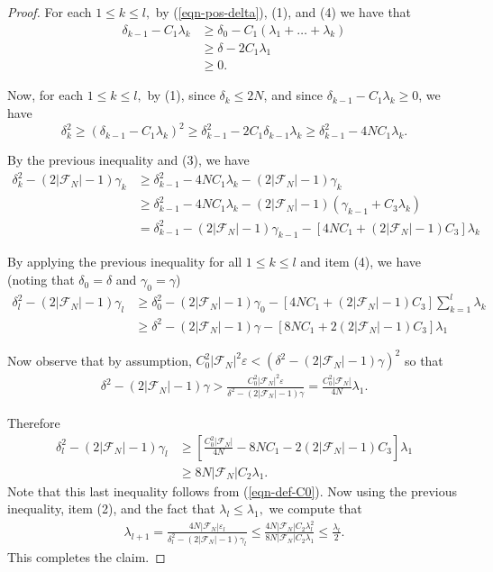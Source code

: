 \documentclass[10pt,a4paper]{amsart}
\newcommand{\cF}{\mathcal{F}}
\newcommand{\ee}{\varepsilon}
\begin{document}
\begin{proof}
    For each $1\le k \le l,$ by (\ref{eqn-pos-delta}), (1), and (4) we have that 
    \begin{align*}
        \delta_{k-1} - C_1\lambda_k &\ge \delta_0 - C_1(\lambda_1 + \ldots + \lambda_k)\\
        &\ge \delta - 2C_1\lambda_1\\
        &\ge 0.
    \end{align*}

    Now, for each $1\le k\le l,$ by (1), since $\delta_k \le 2N$, and since $\delta_{k-1}-C_1\lambda_k\ge 0$, we have
    \begin{equation*}
        \delta_k^2 \ge (\delta_{k-1}- C_1\lambda_k)^2 \ge \delta_{k-1}^2 - 2C_1\delta_{k-1}\lambda_k \ge \delta^2_{k-1} - 4NC_1\lambda_k.
    \end{equation*}

    By the previous inequality and (3), we have
    \begin{align*}
        \delta_k^2 - (2|\cF_N|-1)\gamma_k &\ge \delta^2_{k-1} - 4NC_1\lambda_k - (2|\cF_N|-1)\gamma_k \\
        &\ge \delta^2_{k-1} - 4NC_1\lambda_k - (2|\cF_N|-1)(\gamma_{k-1} + C_3\lambda_k) \\
        &= \delta^2_{k-1}  - (2|\cF_N|-1)\gamma_{k-1} - [4NC_1 + (2|\cF_N|-1)C_3]\lambda_k
    \end{align*}

    By applying the previous inequality for all $1\le k\le l$ and item (4), we have (noting that $\delta_0=\delta$ and $\gamma_0=\gamma$)
    \begin{align*}
         \delta_l^2 - (2|\cF_N|-1)\gamma_l &\ge \delta_0^2 - (2|\cF_N|-1)\gamma_0 - [4NC_1 + (2|\cF_N|-1)C_3]\sum_{k=1}^l\lambda_k\\
         &\ge \delta^2 - (2|\cF_N|-1)\gamma - [8NC_1 + 2(2|\cF_N|-1)C_3]\lambda_1 
    \end{align*}

    Now observe that by assumption, $C_0^2|\cF_N|^2\ee < (\delta^2 - (2|\cF_N|-1)\gamma)^2$ so that 
    \begin{align*}
        \delta^2 - (2|\cF_N|-1)\gamma > \frac{C_0^2|\cF_N|^2\ee}{\delta^2 - (2|\cF_N|-1)\gamma} = \frac{C_0^2|\cF_N|}{4N}\lambda_1.
    \end{align*}

    Therefore 
    \begin{align*}
        \delta_l^2 - (2|\cF_N|-1)\gamma_l &\ge \left[\frac{C_0^2|\cF_N|}{4N} - 8NC_1 - 2(2|\cF_N|-1)C_3\right]\lambda_1 \\
        &\ge 8N|\cF_N|C_2 \lambda_1.
    \end{align*}
        Note that this last inequality follows from (\ref{eqn-def-C0}).
    Now using the previous inequality, item (2), and the fact that $\lambda_l\le \lambda_1,$ we compute that
    \begin{align*}
        \lambda_{l+1} = \frac{4N|\cF_N|\ee_l}{\delta^2_l - (2|\cF_N|-1)\gamma_l} \le \frac{4N|\cF_N|C_2\lambda_l^2}{8N|\cF_N|C_2 \lambda_1} \le \frac{\lambda_l}{2}.
    \end{align*}
    This completes the claim. 


\end{proof}
\end{document}

